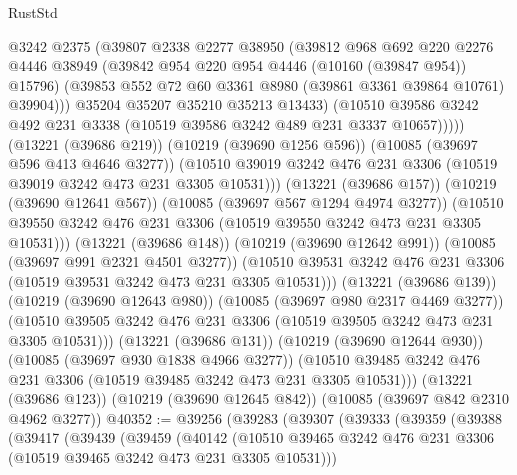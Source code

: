 \begin{lexlean}{RustStd}
\begin{coremodule}
                      @3242
                      @2375
                      (@39807
                        @2338
                        @2277
                        @38950
                        (@39812
                          @968
                          @692
                          @220
                          @2276
                          @4446
                          @38949
                          (@39842 @954 @220 @954 @4446 (@10160 (@39847 @954)) @15796)
                          (@39853 @552 @72 @60 @3361 @8980 (@39861 @3361 @39864 @10761) @39904)))
                      @35204
                      @35207
                      @35210
                      @35213
                      @13433)
                    (@10510
                      @39586
                      @3242
                      @492
                      @231
                      @3338
                      (@10519 @39586 @3242 @489 @231 @3337 @10657)))))
              (@13221 (@39686 @219))
              (@10219 (@39690 @1256 @596))
              (@10085 (@39697 @596 @413 @4646 @3277))
              (@10510 @39019 @3242 @476 @231 @3306 (@10519 @39019 @3242 @473 @231 @3305 @10531)))
            (@13221 (@39686 @157))
            (@10219 (@39690 @12641 @567))
            (@10085 (@39697 @567 @1294 @4974 @3277))
            (@10510 @39550 @3242 @476 @231 @3306 (@10519 @39550 @3242 @473 @231 @3305 @10531)))
          (@13221 (@39686 @148))
          (@10219 (@39690 @12642 @991))
          (@10085 (@39697 @991 @2321 @4501 @3277))
          (@10510 @39531 @3242 @476 @231 @3306 (@10519 @39531 @3242 @473 @231 @3305 @10531)))
        (@13221 (@39686 @139))
        (@10219 (@39690 @12643 @980))
        (@10085 (@39697 @980 @2317 @4469 @3277))
        (@10510 @39505 @3242 @476 @231 @3306 (@10519 @39505 @3242 @473 @231 @3305 @10531)))
      (@13221 (@39686 @131))
      (@10219 (@39690 @12644 @930))
      (@10085 (@39697 @930 @1838 @4966 @3277))
      (@10510 @39485 @3242 @476 @231 @3306 (@10519 @39485 @3242 @473 @231 @3305 @10531)))
    (@13221 (@39686 @123))
    (@10219 (@39690 @12645 @842))
    (@10085 (@39697 @842 @2310 @4962 @3277))
@40352 := @39256
    (@39283
      (@39307
        (@39333
          (@39359
            (@39388
              (@39417
                (@39439
                  (@39459
                    (@40142
                      (@10510
                        @39465
                        @3242
                        @476
                        @231
                        @3306
                        (@10519 @39465 @3242 @473 @231 @3305 @10531)))

\end{coremodule}
\end{lexlean}
